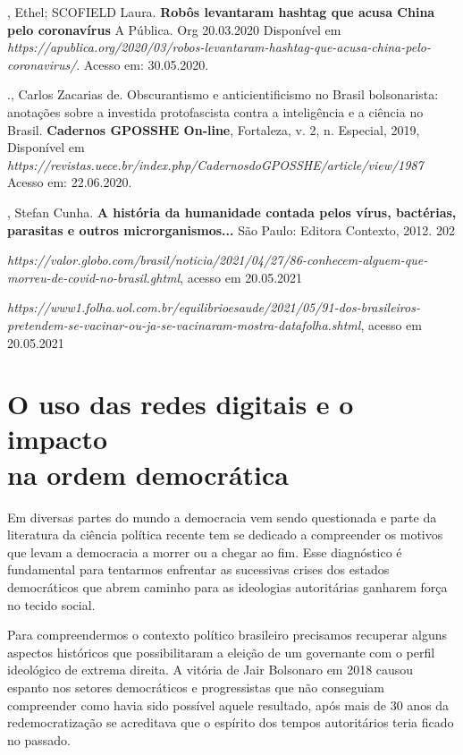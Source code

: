 \begin{bibliohedra}
, Ethel; SCOFIELD Laura. \textbf{Robôs levantaram hashtag que
acusa China pelo coronavírus} A Pública. Org 20.03.2020 Disponível em
\textit{https://apublica.org/2020/03/robos-levantaram-hashtag-que-acusa-china-pelo-coronavirus/}.
Acesso em: 30.05.2020.

., Carlos Zacarias de. Obscurantismo e anticientificismo no
Brasil bolsonarista: anotações sobre a investida protofascista contra a
inteligência e a ciência no Brasil. \textbf{Cadernos GPOSSHE On-line},
Fortaleza, v. 2, n. Especial, 2019, Disponível em
\textit{https://revistas.uece.br/index.php/CadernosdoGPOSSHE/article/view/1987}
Acesso em: 22.06.2020.

, Stefan Cunha. \textbf{A história da humanidade contada pelos
vírus, bactérias, parasitas e outros microrganismos...} São Paulo:
Editora Contexto, 2012. 202

\textit{https://valor.globo.com/brasil/noticia/2021/04/27/86-conhecem-alguem-que-morreu-de-covid-no-brasil.ghtml},
acesso em 20.05.2021

\textit{https://www1.folha.uol.com.br/equilibrioesaude/2021/05/91-dos-brasileiros-pretendem-se-vacinar-ou-ja-se-vacinaram-mostra-datafolha.shtml},
acesso em 20.05.2021
\end{bibliohedra}

\chapter{O uso das redes digitais e o impacto\\na ordem democrática}

Em diversas partes do mundo a democracia vem sendo questionada e parte
da literatura da ciência política recente tem se dedicado a compreender
os motivos que levam a democracia a morrer ou a chegar ao fim. Esse
diagnóstico é fundamental para tentarmos enfrentar as sucessivas crises
dos estados democráticos que abrem caminho para as ideologias
autoritárias ganharem força no tecido social.

Para compreendermos o contexto político brasileiro precisamos recuperar
alguns aspectos históricos que possibilitaram a eleição de um governante
com o perfil ideológico de extrema direita. A vitória de Jair Bolsonaro
em 2018 causou espanto nos setores democráticos e progressistas que não
conseguiam compreender como havia sido possível aquele resultado, após
mais de 30 anos da redemocratização se acreditava que o espírito dos
tempos autoritários teria ficado no passado.

